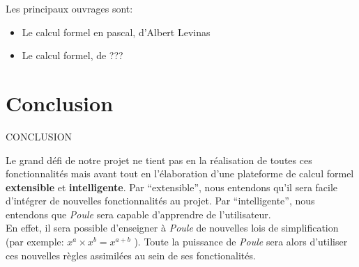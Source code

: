 \documentclass[french,12pt]{report}
\begin{document}
Les principaux ouvrages sont:
\begin {itemize}
\item {Le calcul formel en pascal, d'Albert Levinas}
\item {Le calcul formel, de ???}
\end {itemize}

\pagebreak

\section*{Conclusion}
{\uppercase{Conclusion}}

Le grand  d\'efi de notre projet  ne tient pas en  la r\'ealisation de
toutes ces fonctionnalit\'es mais  avant tout en l'\'elaboration d'une
plateforme    de   calcul    formel   {\bf    extensible}    et   {\bf
intelligente}.  Par ``extensible'', nous  entendons qu'il  sera facile
d'int\'egrer   de   nouvelles   fonctionnalit\'es   au   projet.   Par
``intelligente'',  nous  entendons  que  \emph{  Poule}  sera  capable
d'apprendre de l'utilisateur. \\En effet, il sera possible d'enseigner
\`a \emph{ Poule} de nouvelles lois de simplification (par exemple:
\begin{math}
  {x^{a}} \times {x^{b}} = {x^{a+b}}
\end{math}
).  Toute la  puissance de  \emph{  Poule} sera  alors d'utiliser  ces
nouvelles r\`egles assimil\'ees au sein de ses fonctionalit\'es.
\end{document}

